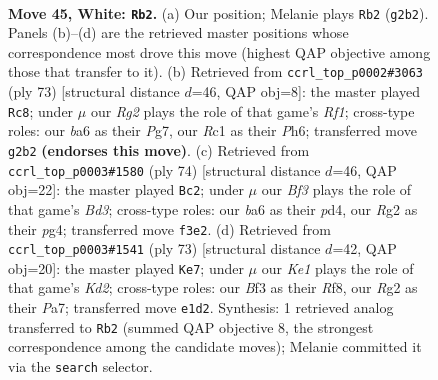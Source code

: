 \documentclass[11pt]{article}
\begin{document}
\clearpage

\begin{figure}[p]\centering
\begin{subfigure}{0.46\textwidth}\centering
\resizebox{\linewidth}{!}{%
\newchessgame
\chessboard[
  setfen={3r2k1/5p1p/br6/p7/3p2P1/1P3B1N/6RP/2R1K3 w - - 4 45},
  showmover=false,
  pgfstyle=straightmove, color=movearrow, markmove={g2-b2}
]}
\caption{}
\end{subfigure}\hfill
\begin{subfigure}{0.46\textwidth}\centering
\resizebox{\linewidth}{!}{%
\newchessgame
\chessboard[
  setfen={5r2/6pk/7p/4nr2/3R4/1p4P1/1P2R1KP/1N6 b - - 7 37},
  showmover=false,
  pgfstyle=straightmove, color=movearrow, markmove={f8-c8}
]}
\caption{}
\end{subfigure}
\\[4pt]
\begin{subfigure}{0.46\textwidth}\centering
\resizebox{\linewidth}{!}{%
\newchessgame
\chessboard[
  setfen={2r2k2/5n2/8/1RP5/p2p1rp1/P2B4/1P6/1K1R4 w - - 1 38},
  showmover=false,
  pgfstyle=straightmove, color=movearrow, markmove={d3-c2}
]}
\caption{}
\end{subfigure}\hfill
\begin{subfigure}{0.46\textwidth}\centering
\resizebox{\linewidth}{!}{%
\newchessgame
\chessboard[
  setfen={5r2/p2k2pp/8/4b3/P1R2p1P/5B2/5PP1/6K1 b - - 0 37},
  showmover=false,
  pgfstyle=straightmove, color=movearrow, markmove={d7-e7}
]}
\caption{}
\end{subfigure}
\caption{\textbf{Move 45, White: \texttt{Rb2}.} (a) Our position; Melanie plays \texttt{Rb2} (\texttt{g2b2}). Panels (b)--(d) are the retrieved master positions whose correspondence most drove this move (highest QAP objective among those that transfer to it). (b) Retrieved from \texttt{ccrl\_top\_p0002\#3063} (ply 73) [structural distance $d$=46, QAP obj=8]: the master played \texttt{Rc8}; under $\mu$ our \emph{Rg2} plays the role of that game's \emph{Rf1}; cross-type roles: our \emph{b}a6 as their \emph{P}g7, our \emph{R}c1 as their \emph{P}h6; transferred move \texttt{g2b2} \textbf{(endorses this move)}. (c) Retrieved from \texttt{ccrl\_top\_p0003\#1580} (ply 74) [structural distance $d$=46, QAP obj=22]: the master played \texttt{Bc2}; under $\mu$ our \emph{Bf3} plays the role of that game's \emph{Bd3}; cross-type roles: our \emph{b}a6 as their \emph{p}d4, our \emph{R}g2 as their \emph{p}g4; transferred move \texttt{f3e2}. (d) Retrieved from \texttt{ccrl\_top\_p0003\#1541} (ply 73) [structural distance $d$=42, QAP obj=20]: the master played \texttt{Ke7}; under $\mu$ our \emph{Ke1} plays the role of that game's \emph{Kd2}; cross-type roles: our \emph{B}f3 as their \emph{R}f8, our \emph{R}g2 as their \emph{P}a7; transferred move \texttt{e1d2}. Synthesis: 1 retrieved analog transferred to \texttt{Rb2} (summed QAP objective 8, the strongest correspondence among the candidate moves); Melanie committed it via the \texttt{search} selector.}
\label{fig:thought-m88}
\end{figure}
\end{document}
